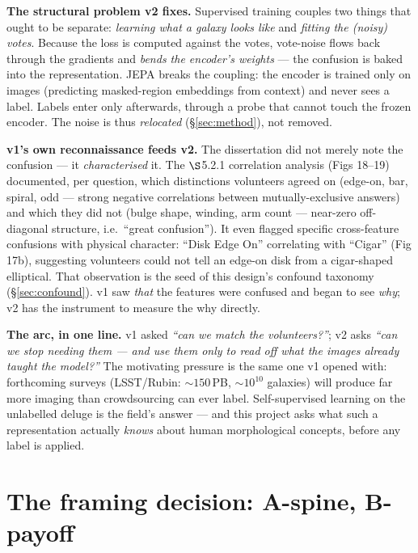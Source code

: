 \documentclass[11pt,a4paper]{article}
\begin{document}
\textbf{The structural problem v2 fixes.} Supervised training couples two things that ought to
be separate: \emph{learning what a galaxy looks like} and \emph{fitting the (noisy) votes}.
Because the loss is computed against the votes, vote-noise flows back through the gradients and
\emph{bends the encoder's weights} --- the confusion is baked into the representation. JEPA
breaks the coupling: the encoder is trained only on images (predicting masked-region embeddings
from context) and never sees a label. Labels enter only afterwards, through a probe that cannot
touch the frozen encoder. The noise is thus \emph{relocated} (\S\ref{sec:method}), not removed.

\textbf{v1's own reconnaissance feeds v2.} The dissertation did not merely note the confusion
--- it \emph{characterised} it. The $\S$5.2.1 correlation analysis (Figs 18--19) documented,
per question, which distinctions volunteers agreed on (edge-on, bar, spiral, odd --- strong
negative correlations between mutually-exclusive answers) and which they did not (bulge shape,
winding, arm count --- near-zero off-diagonal structure, i.e.\ ``great confusion''). It even
flagged specific cross-feature confusions with physical character: ``Disk Edge On'' correlating
with ``Cigar'' (Fig 17b), suggesting volunteers could not tell an edge-on disk from a
cigar-shaped elliptical. That observation is the seed of this design's confound taxonomy
(\S\ref{sec:confound}). v1 saw \emph{that} the features were confused and began to see
\emph{why}; v2 has the instrument to measure the why directly.

\textbf{The arc, in one line.} v1 asked \emph{``can we match the volunteers?''}; v2 asks
\emph{``can we stop needing them --- and use them only to read off what the images already
taught the model?''} The motivating pressure is the same one v1 opened with: forthcoming surveys
(LSST/Rubin: ${\sim}150$\,PB, ${\sim}10^{10}$ galaxies) will produce far more imaging than
crowdsourcing can ever label. Self-supervised learning on the unlabelled deluge is the field's
answer --- and this project asks what such a representation actually \emph{knows} about human
morphological concepts, before any label is applied.

\section{The framing decision: A-spine, B-payoff}\label{sec:framing}
\end{document}
